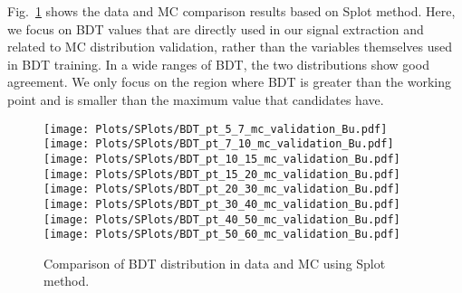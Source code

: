 Fig.~\ref{fig:Splot_BDT} shows the data and MC comparison results based on Splot method. Here, we focus on BDT values that are directly used in our signal extraction and related to MC distribution validation, rather than the variables themselves used in BDT training. In a wide ranges of BDT, the two distributions show good agreement. We only focus on the region where BDT is greater than the working point and is smaller than the maximum value that candidates have.

\begin{figure}[h]
\begin{center}
\texttt{[image: Plots/SPlots/BDT\_pt\_5\_7\_mc\_validation\_Bu.pdf]}
\texttt{[image: Plots/SPlots/BDT\_pt\_7\_10\_mc\_validation\_Bu.pdf]}
\texttt{[image: Plots/SPlots/BDT\_pt\_10\_15\_mc\_validation\_Bu.pdf]}
\texttt{[image: Plots/SPlots/BDT\_pt\_15\_20\_mc\_validation\_Bu.pdf]}
\texttt{[image: Plots/SPlots/BDT\_pt\_20\_30\_mc\_validation\_Bu.pdf]}
\texttt{[image: Plots/SPlots/BDT\_pt\_30\_40\_mc\_validation\_Bu.pdf]}
\texttt{[image: Plots/SPlots/BDT\_pt\_40\_50\_mc\_validation\_Bu.pdf]}
\texttt{[image: Plots/SPlots/BDT\_pt\_50\_60\_mc\_validation\_Bu.pdf]}
\caption{Comparison of \Bplus BDT distribution in data and MC using Splot method.}
\label{fig:Splot_BDT}
\end{center}
\end{figure}


\iffalse

